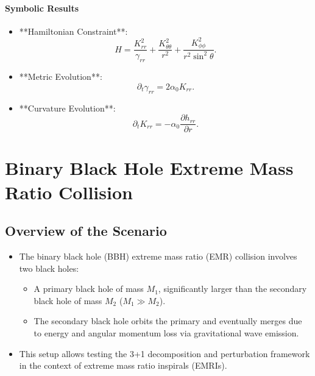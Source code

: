 \documentclass[12pt]{article}
\begin{document}
\paragraph{Symbolic Results}
\begin{itemize}
    \item **Hamiltonian Constraint**:
    \[
    H = \frac{K_{rr}^2}{\gamma_{rr}} + \frac{K_{\theta\theta}^2}{r^2} + \frac{K_{\phi\phi}^2}{r^2 \sin^2\theta}.
    \]
    \item **Metric Evolution**:
    \[
    \partial_t \gamma_{rr} = 2\alpha_0 K_{rr}.
    \]
    \item **Curvature Evolution**:
    \[
    \partial_t K_{rr} = -\alpha_0 \frac{\partial h_{rr}}{\partial r}.
    \]
\end{itemize}

\section{Binary Black Hole Extreme Mass Ratio Collision}

\subsection{Overview of the Scenario}
\begin{itemize}
    \item The binary black hole (BBH) extreme mass ratio (EMR) collision involves two black holes:
    \begin{itemize}
        \item A primary black hole of mass $M_1$, significantly larger than the secondary black hole of mass $M_2$ ($M_1 \gg M_2$).
        \item The secondary black hole orbits the primary and eventually merges due to energy and angular momentum loss via gravitational wave emission.
    \end{itemize}
    \item This setup allows testing the 3+1 decomposition and perturbation framework in the context of extreme mass ratio inspirals (EMRIs).
\end{itemize}
\end{document}
